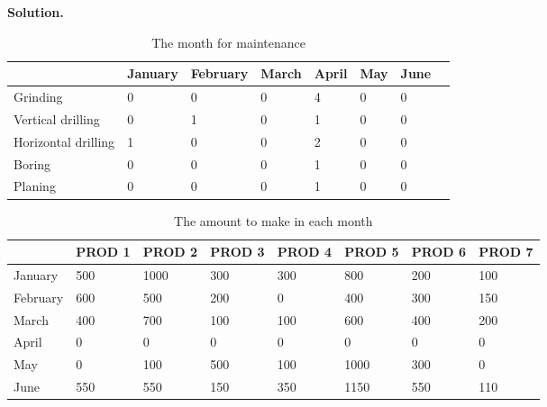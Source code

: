 \documentclass[12pt,a4paper]{article}
\theoremstyle{definition}
\begin{document}
\textbf{Solution.}
	\begin{table}\caption{The month for maintenance}
		\begin{tabular}{m{} m{}<{\centering} m{}<{\centering} m{}<{\centering} m{}<{\centering} m{}<{\centering} m{}<{\centering} m{}<{\centering}}
			\hline
			& \textbf{January} & \textbf{February} & \textbf{March} & \textbf{April} & \textbf{May} & \textbf{June} \\\hline
			Grinding &0 & 0 &0 &4 & 0 & 0  \\
			Vertical drilling & 0 & 1 & 0 & 1 & 0 & 0  \\
			Horizontal drilling & 1 & 0 & 0 & 2 &0 & 0  \\
			Boring & 0 & 0 & 0 & 1 & 0 & 0  \\
			Planing & 0 & 0 & 0 & 1 & 0 & 0 \\
			\hline
		\end{tabular}
	\end{table}
         \begin{table}[htbp]\caption{The amount to make in each month}
        	\scriptsize
        	\centering
        	\renewcommand\arraystretch{1.1}
        	\begin{tabular}{m{} m{}<{\centering} m{}<{\centering} m{}<{\centering} m{}<{\centering} m{}<{\centering} m{}<{\centering} m{}<{\centering}}
        		\hline
        		& \textbf{PROD 1} & \textbf{PROD 2} & \textbf{PROD 3} & \textbf{PROD 4} & \textbf{PROD 5} & \textbf{PROD 6} &  \textbf{PROD 7} \\\hline
        		January & 500 & 1000 & 300 & 300 & 800 & 200 & 100 \\
        		February & 600 & 500 & 200 & 0 & 400 & 300 & 150 \\
        		March & 400 & 700 & 100 & 100 & 600 & 400 & 200 \\
        		April & 0 & 0 & 0 & 0 & 0 & 0 & 0 \\
        		May & 0 & 100 & 500 & 100 & 1000 & 300 & 0 \\
        		June & 550 & 550 & 150 & 350 & 1150 & 550 & 110 \\
        		\hline
        	\end{tabular}
        \end{table}
    
\end{document}
